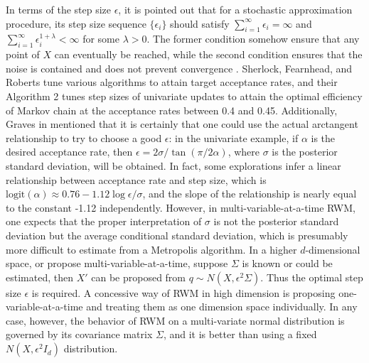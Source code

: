In terms of the step size $\epsilon$, it is pointed out that for a stochastic approximation procedure, its step size sequence $\{\epsilon_i\}$ should satisfy $\sum_{i=1}^\infty \epsilon_i=\infty $ and $\sum_{i=1}^\infty \epsilon_i^{1+\lambda}<\infty $ for some $\lambda>0$. The former condition somehow ensure that any point of $X$ can eventually be reached, while the second condition ensures that the noise is contained and does not prevent convergence \cite{andrieu2008tutorial}. Sherlock, Fearnhead, and Roberts \cite{sherlock2010random} tune various algorithms to attain target acceptance rates, and their Algorithm 2 tunes step sizes of univariate updates to attain the optimal efficiency of Markov chain at the acceptance rates between 0.4 and 0.45. Additionally, Graves in \cite{graves2011automatic} mentioned that it is certainly that one could use the actual arctangent relationship to try to choose a good $\epsilon$: in the univariate example, if $\alpha$ is the desired acceptance rate, then $\epsilon = 2\sigma / \tan (\pi/2\alpha)$, where $\sigma$ is the posterior standard deviation, will be obtained. In fact, some explorations infer a linear relationship between acceptance rate and step size, which is $\mbox{logit}(\alpha) \approx 0.76-1.12\log \epsilon/\sigma$, and the slope of the relationship is nearly equal to the constant -1.12 independently. However, in multi-variable-at-a-time RWM, one expects that the proper interpretation of $\sigma$ is not the posterior standard deviation but the average conditional standard deviation, which is presumably more difficult to estimate from a Metropolis algorithm. In a higher $d$-dimensional space, or propose multi-variable-at-a-time, suppose $\Sigma$ is known or could be estimated, then $X'$ can be proposed from $q\sim N(X,\epsilon^2\Sigma)$. Thus the optimal step size $\epsilon$ is required. A concessive way of RWM in high dimension is proposing one-variable-at-a-time and treating them as one dimension space individually. In any case, however, the behavior of RWM on a multi-variate normal distribution is governed by its covariance matrix $\Sigma$, and it is better than using a fixed $N(X,\epsilon^2I_d)$ distribution\cite{roberts2001optimal}.


